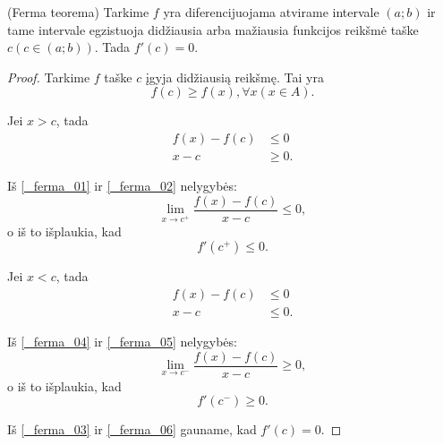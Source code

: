 \begin{prop}
  (Ferma teorema) Tarkime $f$ yra diferencijuojama atvirame intervale
  $(a; b)$ ir tame intervale egzistuoja didžiausia arba mažiausia
  funkcijos reikšmė taške $c (c \in (a; b))$. Tada $f'(c) = 0$.

  \begin{proof}
    Tarkime $f$ taške $c$ įgyja didžiausią reikšmę. Tai yra
    \begin{equation*}
      f(c) \geq f(x), \forall x (x \in A).
    \end{equation*}

    Jei $x > c$, tada 
    \begin{align}
      f(x) - f(c) &\leq 0
      \label{_ferma_01} \\
      x - c &\geq 0
      \label{_ferma_02}.
    \end{align}

    Iš \ref{_ferma_01} ir \ref{_ferma_02} nelygybės:
    \begin{equation*}
      \lim _{x \to c^{+}} \frac{f(x) - f(c)}{x - c} \leq 0,
    \end{equation*}
    o iš to išplaukia, kad
    \begin{equation}
      f'(c^{+}) \leq 0.
      \label{_ferma_03}
    \end{equation}

    Jei $x < c$, tada
    \begin{align}
      f(x) - f(c) &\leq 0
      \label{_ferma_04} \\
      x - c &\leq 0
      \label{_ferma_05}.
    \end{align}

    Iš \ref{_ferma_04} ir \ref{_ferma_05} nelygybės:
    \begin{equation*}
      \lim _{x \to c^{-}} \frac{f(x) - f(c)}{x - c} \geq 0,
    \end{equation*}
    o iš to išplaukia, kad
    \begin{equation}
      f'(c^{-}) \geq 0.
      \label{_ferma_06}
    \end{equation}

    Iš \ref{_ferma_03} ir \ref{_ferma_06} gauname, kad $f'(c) = 0$.
  \end{proof}
\end{prop}

